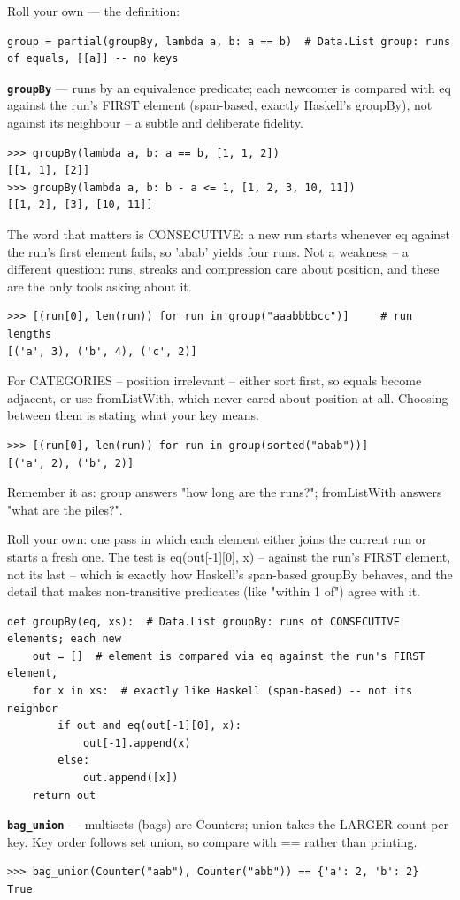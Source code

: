 \documentclass[10pt,letterpaper]{article}
\begin{document}
Roll your own --- the definition:

\begin{lstlisting}[style=ex]
group = partial(groupBy, lambda a, b: a == b)  # Data.List group: runs of equals, [[a]] -- no keys
\end{lstlisting}
\textbf{\texttt{groupBy}} --- runs by an equivalence predicate; each newcomer is compared with eq against the run's FIRST element (span-based, exactly Haskell's groupBy), not against its neighbour -- a subtle and deliberate fidelity.
\begin{lstlisting}[style=ex]
>>> groupBy(lambda a, b: a == b, [1, 1, 2])
[[1, 1], [2]]
>>> groupBy(lambda a, b: b - a <= 1, [1, 2, 3, 10, 11])
[[1, 2], [3], [10, 11]]
\end{lstlisting}

The word that matters is CONSECUTIVE: a new run starts whenever eq against the run's first element fails, so 'abab' yields four runs. Not a weakness -- a different question: runs, streaks and compression care about position, and these are the only tools asking about it.

\begin{lstlisting}[style=ex]
>>> [(run[0], len(run)) for run in group("aaabbbbcc")]     # run lengths
[('a', 3), ('b', 4), ('c', 2)]
\end{lstlisting}

For CATEGORIES -- position irrelevant -- either sort first, so equals become adjacent, or use fromListWith, which never cared about position at all. Choosing between them is stating what your key means.

\begin{lstlisting}[style=ex]
>>> [(run[0], len(run)) for run in group(sorted("abab"))]
[('a', 2), ('b', 2)]
\end{lstlisting}

Remember it as: group answers "how long are the runs?"; fromListWith answers "what are the piles?".


Roll your own: one pass in which each element either joins the current run or starts a fresh one. The test is eq(out[-1][0], x) -- against the run's FIRST element, not its last -- which is exactly how Haskell's span-based groupBy behaves, and the detail that makes non-transitive predicates (like "within 1 of") agree with it.

\begin{lstlisting}[style=ex]
def groupBy(eq, xs):  # Data.List groupBy: runs of CONSECUTIVE elements; each new
    out = []  # element is compared via eq against the run's FIRST element,
    for x in xs:  # exactly like Haskell (span-based) -- not its neighbor
        if out and eq(out[-1][0], x):
            out[-1].append(x)
        else:
            out.append([x])
    return out
\end{lstlisting}
\textbf{\texttt{bag\_union}} --- multisets (bags) are Counters; union takes the LARGER count per key. Key order follows set union, so compare with == rather than printing.
\begin{lstlisting}[style=ex]
>>> bag_union(Counter("aab"), Counter("abb")) == {'a': 2, 'b': 2}
True
\end{lstlisting}
\end{document}
